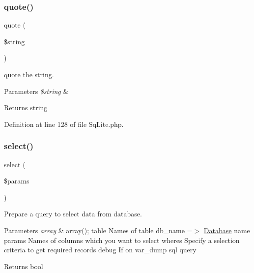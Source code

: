 \subsubsection{\texorpdfstring{quote()}{quote()}}
{\footnotesize\ttfamily quote (\begin{DoxyParamCaption}\item[{}]{\$string }\end{DoxyParamCaption})}

quote the string.


\begin{DoxyParams}{Parameters}
{\em \$string} & \\
\hline
\end{DoxyParams}
\begin{DoxyReturn}{Returns}
string 
\end{DoxyReturn}


Definition at line 128 of file Sq\+Lite.\+php.

\mbox{\label{class_zest_1_1_database_1_1_drives_1_1_sq_lite_1_1_sq_lite_aaade19290861bb3abf902bb14a51889b}} 
\subsubsection{\texorpdfstring{select()}{select()}}
{\footnotesize\ttfamily select (\begin{DoxyParamCaption}\item[{}]{\$params }\end{DoxyParamCaption})}

Prepare a query to select data from database.


\begin{DoxyParams}{Parameters}
{\em array} & array(); \textquotesingle{}table\textquotesingle{} Names of table \textquotesingle{}db\+\_\+name\textquotesingle{} =$>$ \mbox{\hyperlink{namespace_zest_1_1_database}{Database}} name \textquotesingle{}params\textquotesingle{} Names of columns which you want to select \textquotesingle{}wheres\textquotesingle{} Specify a selection criteria to get required records \textquotesingle{}debug\textquotesingle{} If on var\+\_\+dump sql query\\
\hline
\end{DoxyParams}
\begin{DoxyReturn}{Returns}
bool 
\end{DoxyReturn}


